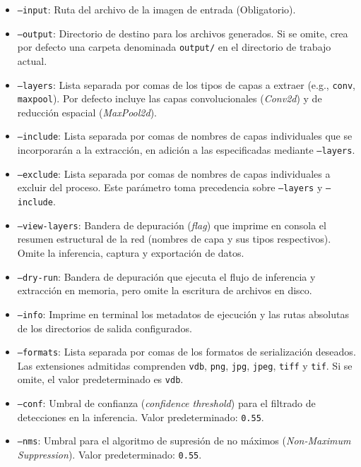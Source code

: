 \begin{itemize}
    \item \texttt{--input}: Ruta del archivo de la imagen de entrada (Obligatorio).
    \item \texttt{--output}: Directorio de destino para los archivos generados. Si se omite, crea por defecto una carpeta denominada 
    \texttt{output/} en el directorio de trabajo actual.
    \item \texttt{--layers}: Lista separada por comas de los tipos de capas a extraer (e.g., \texttt{conv}, \texttt{maxpool}). 
    Por defecto incluye las capas convolucionales (\textit{Conv2d}) y de reducción espacial (\textit{MaxPool2d}).
    \item \texttt{--include}: Lista separada por comas de nombres de capas individuales que se incorporarán a la extracción, en adición 
    a las especificadas mediante \texttt{--layers}.
    \item \texttt{--exclude}: Lista separada por comas de nombres de capas individuales a excluir del proceso. Este parámetro toma 
    precedencia sobre \texttt{--layers} y \texttt{--include}.
    \item \texttt{--view-layers}: Bandera de depuración (\textit{flag}) que imprime en consola el resumen estructural de la red 
    (nombres de capa y sus tipos respectivos). Omite la inferencia, captura y exportación de datos.
    \item \texttt{--dry-run}: Bandera de depuración que ejecuta el flujo de inferencia y extracción en memoria, pero omite la 
    escritura de archivos en disco.
    \item \texttt{--info}: Imprime en terminal los metadatos de ejecución y las rutas absolutas de los directorios de salida configurados.
    \item \texttt{--formats}: Lista separada por comas de los formatos de serialización deseados. Las extensiones admitidas comprenden 
    \texttt{vdb}, \texttt{png}, \texttt{jpg}, \texttt{jpeg}, \texttt{tiff} y \texttt{tif}. Si se omite, el valor predeterminado es \texttt{vdb}.
    \item \texttt{--conf}: Umbral de confianza (\textit{confidence threshold}) para el filtrado de detecciones en la inferencia. 
    Valor predeterminado: \texttt{0.55}.
    \item \texttt{--nms}: Umbral para el algoritmo de supresión de no máximos (\textit{Non-Maximum Suppression}). Valor predeterminado: \texttt{0.55}.
\end{itemize}

